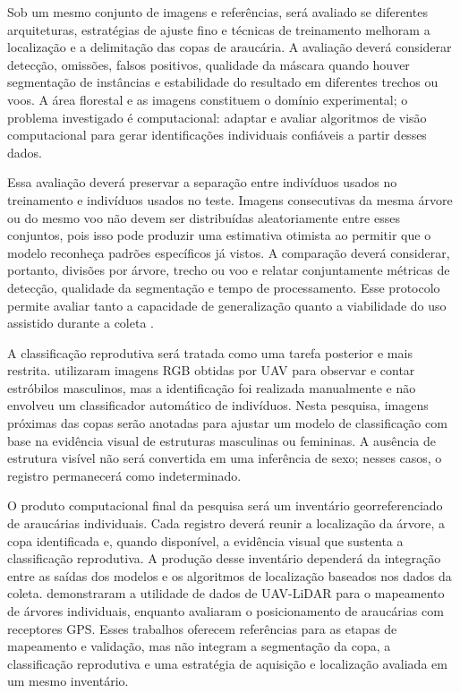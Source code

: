 Sob um mesmo conjunto de imagens e referências, será avaliado se diferentes arquiteturas, estratégias de ajuste fino e técnicas de treinamento melhoram a localização e a delimitação das copas de araucária. A avaliação deverá considerar detecção, omissões, falsos positivos, qualidade da máscara quando houver segmentação de instâncias e estabilidade do resultado em diferentes trechos ou voos. A área florestal e as imagens constituem o domínio experimental; o problema investigado é computacional: adaptar e avaliar algoritmos de visão computacional para gerar identificações individuais confiáveis a partir desses dados.

Essa avaliação deverá preservar a separação entre indivíduos usados no treinamento e indivíduos usados no teste. Imagens consecutivas da mesma árvore ou do mesmo voo não devem ser distribuídas aleatoriamente entre esses conjuntos, pois isso pode produzir uma estimativa otimista ao permitir que o modelo reconheça padrões específicos já vistos. A comparação deverá considerar, portanto, divisões por árvore, trecho ou voo e relatar conjuntamente métricas de detecção, qualidade da segmentação e tempo de processamento. Esse protocolo permite avaliar tanto a capacidade de generalização quanto a viabilidade do uso assistido durante a coleta \citep{zhao2023}.

A classificação reprodutiva será tratada como uma tarefa posterior e mais restrita. \citet{demetrio2022} utilizaram imagens RGB obtidas por UAV para observar e contar estróbilos masculinos, mas a identificação foi realizada manualmente e não envolveu um classificador automático de indivíduos. Nesta pesquisa, imagens próximas das copas serão anotadas para ajustar um modelo de classificação com base na evidência visual de estruturas masculinas ou femininas. A ausência de estrutura visível não será convertida em uma inferência de sexo; nesses casos, o registro permanecerá como indeterminado.

O produto computacional final da pesquisa será um inventário georreferenciado de araucárias individuais. Cada registro deverá reunir a localização da árvore, a copa identificada e, quando disponível, a evidência visual que sustenta a classificação reprodutiva. A produção desse inventário dependerá da integração entre as saídas dos modelos e os algoritmos de localização baseados nos dados da coleta. \citet{saad2021} demonstraram a utilidade de dados de UAV-LiDAR para o mapeamento de árvores individuais, enquanto \citet{venancio2010} avaliaram o posicionamento de araucárias com receptores GPS. Esses trabalhos oferecem referências para as etapas de mapeamento e validação, mas não integram a segmentação da copa, a classificação reprodutiva e uma estratégia de aquisição e localização avaliada em um mesmo inventário.

